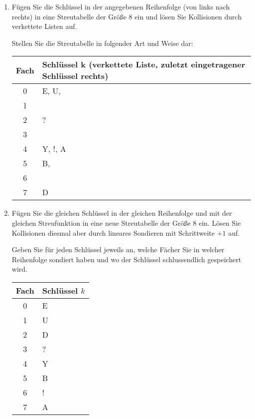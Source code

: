 \documentclass{bschlangaul-aufgabe}
\begin{document}
\begin{enumerate}


\item Fügen Sie die Schlüssel in der angegebenen Reihenfolge (von links
nach rechts) in eine Streutabelle der Größe 8 ein und lösen Sie
Kollisionen durch verkettete Listen auf.

Stellen Sie die Streutabelle in folgender Art und Weise dar:

\begin{bAntwort}
\begin{center}
\begin{tabular}{|c||l|}
\hline
Fach & Schlüssel k {\scriptsize(verkettete Liste, zuletzt eingetragener Schlüssel rechts)}\\
\hline
0 & E, U, \\
1 & \\
2 & ? \\
3 & \\
4 & Y, !, A \\
5 & B, \\
6 & \\
7 & D\\
\hline
\end{tabular}
\end{center}
\end{bAntwort}


\item Fügen Sie die gleichen Schlüssel in der gleichen Reihenfolge und
mit der gleichen Streufunktion in eine neue Streutabelle der Größe $8$
ein. Lösen Sie Kollisionen diesmal aber durch lineares Sondieren mit
Schrittweite $+1$ auf.

Geben Sie für jeden Schlüssel jeweils an, welche Fächer Sie in welcher
Reihenfolge sondiert haben und wo der Schlüssel schlussendlich
gespeichert wird.

\begin{bAntwort}
\begin{center}
\begin{tabular}{|c||l|}
\hline
Fach & Schlüssel $k$\\
\hline
0 & E \\
1 & U \\
2 & D \\
3 & ? \\
4 & Y\\
5 & B \\
6 & !\\
7 & A \\
\hline
\end{tabular}
\end{center}


\end{bAntwort}
\end{enumerate}
\end{document}
